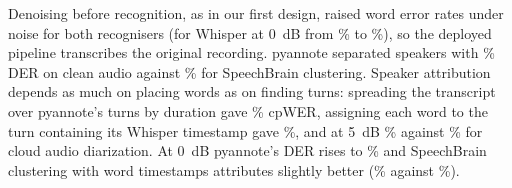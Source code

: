 Denoising before recognition, as in our first design, raised word error rates under noise for both recognisers (for Whisper at 0~dB from \ResAudioWerGroqRawZero\% to \ResAudioWerGroqEnhZero\%), so the deployed pipeline transcribes the original recording. pyannote separated speakers with \ResAudioDerPyaClean\% DER on clean audio against \ResAudioDerSbRawClean\% for SpeechBrain clustering. Speaker attribution depends as much on placing words as on finding turns: spreading the transcript over pyannote's turns by duration gave \ResAudioCpPyaPropClean\% cpWER, assigning each word to the turn containing its Whisper timestamp gave \ResAudioCpPyaWordsClean\%, and at 5~dB \ResAudioCpPyaWordsFive\% against \ResAudioCpGemAudioFive\% for cloud audio diarization. At 0~dB pyannote's DER rises to \ResAudioDerPyaZero\% and SpeechBrain clustering with word timestamps attributes slightly better (\ResAudioCpSbWordsZero\% against \ResAudioCpPyaWordsZero\%).
